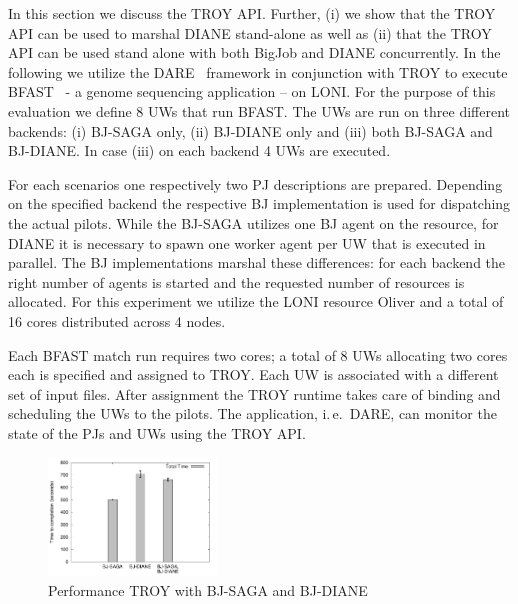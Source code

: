 \documentclass[conference,final]{IEEEtran}
\newcommand{\smnote}[1]{ {\textcolor{green} { ***sharath: #1 }}}
\newcommand{\smnote}[1]{}
\begin{document}
In this section we discuss the TROY API. Further, (i) we show that the TROY API
can be used to marshal DIANE stand-alone as well as (ii) that the TROY API can
be used stand alone with both BigJob and DIANE concurrently. In the following we
utilize the DARE~\cite{dare-tg11} framework in conjunction with TROY to execute
BFAST~\cite{bfast2009} - a genome sequencing application -- on LONI. For the
purpose of this evaluation we define 8 UWs that run BFAST. The UWs are
run on three different backends: (i) BJ-SAGA only, (ii) BJ-DIANE only and (iii)
both BJ-SAGA and BJ-DIANE. In case (iii) on each backend 4 UWs are executed.

For each scenarios one respectively two PJ descriptions are prepared. Depending
on the specified backend the respective BJ implementation is used for
dispatching the actual pilots. While the BJ-SAGA utilizes one BJ agent on the
resource, for DIANE it is necessary to spawn one worker agent per UW that is
executed in parallel. The BJ implementations marshal these differences: for each
backend the right number of agents is started and the requested number of
resources is allocated. For this experiment we utilize the LONI resource Oliver
and a total of 16 cores distributed across 4 nodes.

Each BFAST match run requires two cores; a total of 8 UWs allocating two cores
each is specified and assigned to TROY. Each UW is associated with a different
set of input files. After assignment the TROY runtime takes care of binding and
scheduling the UWs to the pilots. The application, i.\,e.\ DARE, can monitor the
state of the PJs and UWs using the TROY API.




\begin{figure}[t]
	\centering
		\includegraphics[width=0.4\textwidth]{perf/perf-bfast-bj.pdf}
	\caption{Performance TROY with BJ-SAGA and BJ-DIANE}
	\label{fig:perf_perf-bfast-bj}
\end{figure}
\end{document}
